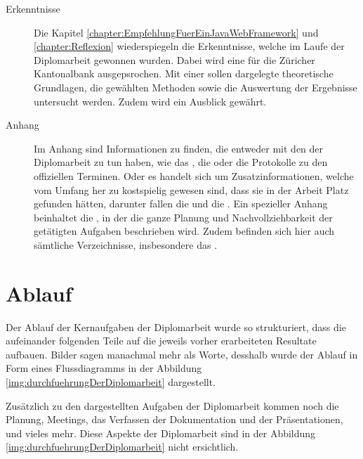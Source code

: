 \begin{description}
  \item[Erkenntnisse]
  
  Die Kapitel \ref{chapter:EmpfehlungFuerEinJavaWebFramework} und
  \ref{chapter:Reflexion} wiederspiegeln die Erkenntnisse, welche im Laufe
  der Diplomarbeit gewonnen wurden. Dabei wird eine
   für die Züricher
  Kantonalbank ausgepsrochen. Mit einer  sollen
  dargelegte theoretische Grundlagen, die gewählten Methoden sowie die
  Auswertung der Ergebnisse untersucht werden. Zudem wird ein Ausblick gewährt.
  
  \item[Anhang]
  
  Im Anhang sind Informationen zu finden, die entweder mit den
   der Diplomarbeit zu tun haben, wie das
  , die 
  oder die Protokolle zu den offiziellen Terminen. Oder es handelt sich um
  Zusatzinformationen, welche vom Umfang her zu kostspielig gewesen sind, dass
  sie in der Arbeit Platz gefunden hätten, darunter fallen die
   und die
  . Ein spezieller Anhang
  beinhaltet die , in der die ganze
  Planung und Nachvollziehbarkeit der getätigten Aufgaben beschrieben wird.
  Zudem befinden sich hier auch sämtliche Verzeichnisse, insbesondere das
  \bibname.
  
  \end{description}
  
  \section{Ablauf}

  Der Ablauf der Kernaufgaben der Diplomarbeit wurde so strukturiert, dass die
  aufeinander folgenden Teile auf die jeweils vorher erarbeiteten Resultate
  aufbauen. Bilder sagen manachmal mehr als Worte, desshalb wurde der Ablauf in
  Form eines Flussdiagramms in der Abbildung
  \ref{img:durchfuehrungDerDiplomarbeit} dargestellt.
  
  Zusätzlich zu den dargestellten Aufgaben der Diplomarbeit kommen noch
  die Planung, Meetings, das Verfassen der Dokumentation und der Präsentationen,
  und vieles mehr. Diese Aspekte der Diplomarbeit sind in der Abbildung
  \ref{img:durchfuehrungDerDiplomarbeit} nicht ersichtlich.
  \newline
  
